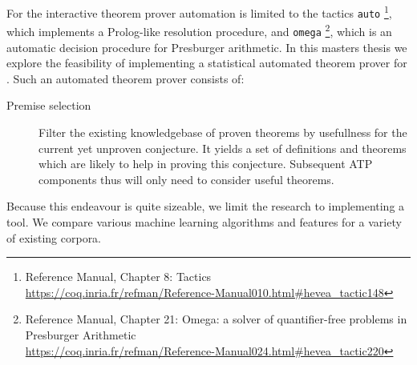 
For the \coq interactive theorem prover automation is limited to the tactics \texttt{auto}%
\footnote{\coq Reference Manual, Chapter 8: Tactics\\\url{https://coq.inria.fr/refman/Reference-Manual010.html\#hevea_tactic148}},
which implements a Prolog-like resolution procedure, and \texttt{omega}%
\footnote{\coq Reference Manual, Chapter 21: Omega: a solver of quantifier-free problems in Presburger Arithmetic\\\url{https://coq.inria.fr/refman/Reference-Manual024.html\#hevea_tactic220}},
which is an automatic decision procedure for Presburger arithmetic.
In this masters thesis we explore the feasibility of implementing a statistical automated theorem prover for \coq.
Such an automated theorem prover consists of:
\begin{description}
\item[Premise selection] Filter the existing knowledgebase of proven theorems by usefullness for the current yet unproven conjecture.
It yields a set of definitions and theorems which are likely to help in proving this conjecture.
Subsequent ATP components thus will only need to consider useful theorems.
\item[]
\end{description}

Because this endeavour is quite sizeable, we limit the research to implementing a \premiseselection tool.
We compare various machine learning algorithms and features for a variety of existing \coq corpora.
